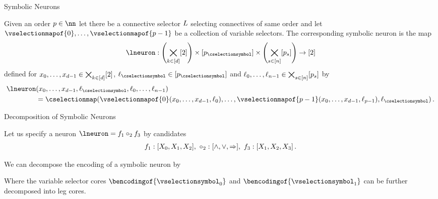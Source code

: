 \documentclass{beamer}
\begin{document}
\begin{frame}{Symbolic Neurons}

\begin{definition}
	Given an order $\seldim\in\nn$ let there be a connective selector $L$ selecting connectives of same order and let $\vselectionmapof{0},\ldots,\vselectionmapof{\seldim-1}$ be a collection of variable selectors.
	The corresponding symbolic neuron is the map
	\begin{align*}
		\lneuron : \left(\atomstates\right) \times [\seldimof{\cselectionsymbol}] \times \left( \bigtimes_{\selenumeratorin} [\seldimof{\selenumerator}]\right) \rightarrow [2]
	\end{align*}
	defined for ${x_{0},\ldots,x_{d-1}}\in\bigtimes_{k\in[d]}[2]$, $\selindexof{\cselectionsymbol}\in[\seldimof{\cselectionsymbol}]$ and
	$\ell_{0},\ldots,\ell_{n-1}\in \bigtimes_{s\in[n]} [p_{s}]$ by
	\begin{align*}
		\lneuron& (\atomindices,\selindexof{\cselectionsymbol}, \selindices)  \\
		& =\cselectionmap(\vselectionmapof{0}(\atomindices, \selindexof{0}),\ldots,\vselectionmapof{\seldim-1}(\atomindices,\selindexof{\seldim-1}), \selindexof{\cselectionsymbol}) \, .
	\end{align*}
\end{definition}

\end{frame}


\begin{frame}{Decomposition of Symbolic Neurons}

Let us specify a neuron $ \lneuron = \exformula_1 \exconnective_2 \exformula_3$ by candidates
\begin{align*}
 f_1 : [X_0,X_1,X_2] , \,\,  \circ_2 : [\land,\lor, \Rightarrow] , \, \, f_3 : [X_1,X_2,X_3] \, . 
\end{align*}

We can decompose the encoding of a symbolic neuron by 
\begin{center}
	
\end{center}	
Where the variable selector cores $\bencodingof{\vselectionsymbol_0}$ and $\bencodingof{\vselectionsymbol_1}$ can be further decomposed into leg cores.
\end{frame}
\end{document}
